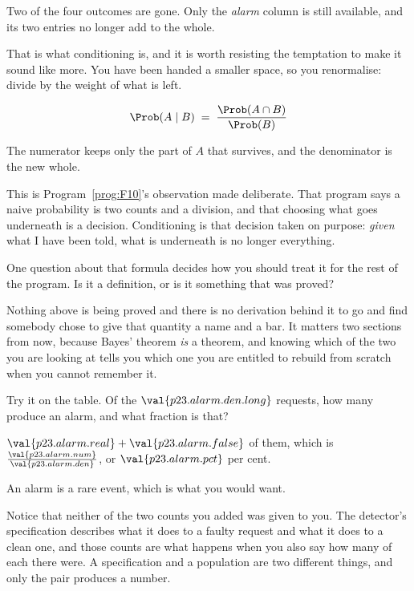 \begin{fr}
\begin{ansblock}
Two of the four outcomes are gone. Only the \emph{alarm} column is still
available, and its two entries no longer add to the whole.
\end{ansblock}

That is what conditioning is, and it is worth resisting the temptation to make
it sound like more. You have been handed a smaller space, so you renormalise:
divide by the weight of what is left.

\[ \Prob(A \mid B) \;=\; \frac{\Prob(A \cap B)}{\Prob(B)} \]

The numerator keeps only the part of $A$ that survives, and the denominator is
the new whole.
\end{fr}

\begin{fr}
This is Program~\ref{prog:F10}'s observation made deliberate. That program says
a naive probability is two counts and a division, and that choosing what goes
underneath is a decision. Conditioning is that decision taken on purpose:
\emph{given} what I have been told, what is underneath is no longer everything.

One question about that formula decides how you should treat it for the rest of
the program. Is it a definition, or is it something that was proved?
\dotline
\nextframe
\end{fr}

\begin{fr}

\begin{warning}
Nothing above is being proved and there is no derivation behind it to go and
find \dash{} somebody chose to give that quantity a name and a bar. It matters
two sections from now, because Bayes' theorem \emph{is} a theorem, and knowing
which of the two you are looking at tells you which one you are entitled to
rebuild from scratch when you cannot remember it.
\end{warning}

Try it on the table. Of the $\val{p23.alarm.den.long}$ requests, how many
produce an alarm, and what fraction is that?
\dotline
\nextframe
\end{fr}

\begin{fr}
\begin{ansblock}
$\val{p23.alarm.real} + \val{p23.alarm.false}$ of them, which is
$\frac{\val{p23.alarm.num}}{\val{p23.alarm.den}}$, or
$\val{p23.alarm.pct}$ per cent.
\end{ansblock}

An alarm is a rare event, which is what you would want.

\begin{note}
Notice that neither of the two counts you added was given to you. The
detector's specification describes what it does to a faulty request and what
it does to a clean one, and those counts are what happens when you also say
how many of each there were. A specification and a population are two
different things, and only the pair produces a number.
\end{note}
\end{fr}

